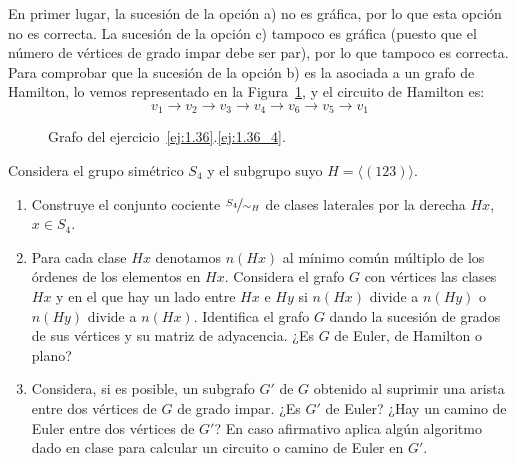 \begin{ejercicio}
\begin{enumerate}
        En primer lugar, la sucesión de la opción a) no es gráfica, por lo que esta opción no es correcta. La sucesión de la opción c) tampoco es gráfica (puesto que el número de vértices de grado impar debe ser par), por lo que tampoco es correcta. Para comprobar que la sucesión de la opción b) es la asociada a un grafo de Hamilton, lo vemos representado en la Figura~\ref{fig:1.36_4}, y el circuito de Hamilton es:
        \begin{equation*}
            v_1\to v_2\to v_3\to v_4\to v_6\to v_5\to v_1
        \end{equation*}
        \begin{figure}
            \centering
            \caption{Grafo del ejercicio~\ref{ej:1.36}.\ref{ej:1.36_4}.}
            \label{fig:1.36_4}
        \end{figure}
    \end{enumerate}
\end{ejercicio}

\begin{ejercicio}\label{ej:1.37}
    Considera el grupo simétrico $S_4$ y el subgrupo suyo $H = \langle (1 2 3) \rangle$.
    \begin{enumerate}
        \item Construye el conjunto cociente $\nicefrac{S_4}{\sim_H}$ de clases laterales por la derecha $Hx$, $x \in S_4$.
        \item Para cada clase $Hx$ denotamos $n(Hx)$ al mínimo común múltiplo de los órdenes de los elementos en $Hx$. Considera el grafo $G$ con vértices las clases $Hx$ y en el que hay un lado entre $Hx$ e $Hy$ si $n(Hx)$ divide a $n(Hy)$ o $n(Hy)$ divide a $n(Hx)$. Identifica el grafo $G$ dando la sucesión de grados de sus vértices y su matriz de adyacencia. ¿Es $G$ de Euler, de Hamilton o plano?
        \item Considera, si es posible, un subgrafo $G'$ de $G$ obtenido al suprimir una arista entre dos vértices de $G$ de grado impar. ¿Es $G'$ de Euler? ¿Hay un camino de Euler entre dos vértices de $G'$? En caso afirmativo aplica algún algoritmo dado en clase para calcular un circuito o camino de Euler en $G'$.
    \end{enumerate}
\end{ejercicio}

